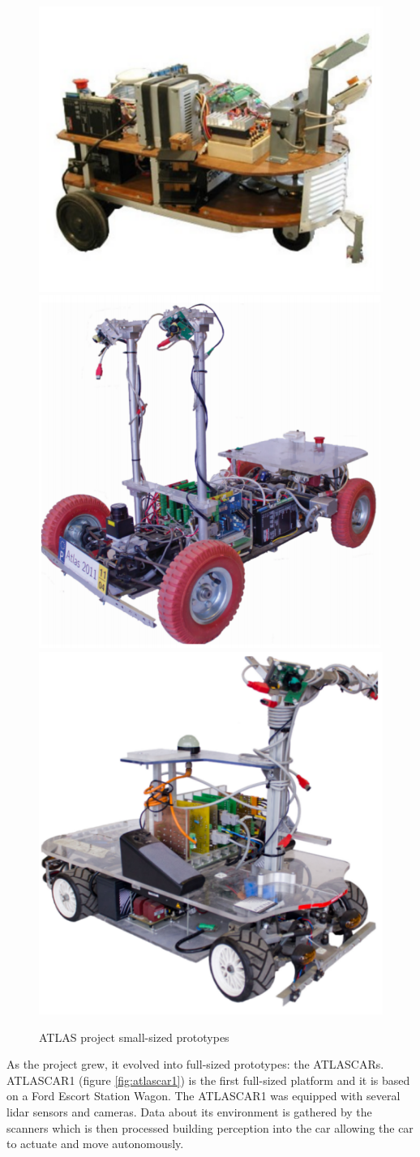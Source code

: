 \begin{figure}[htp]
	
	\centering
	\includegraphics[width=.3\textwidth]{capintro/imgs/atlas1}\hfill
	\includegraphics[width=.3\textwidth]{capintro/imgs/atlas2000}\hfill
	\includegraphics[width=.3\textwidth]{capintro/imgs/atlasmv}
	
	\caption{ATLAS project small-sized prototypes \cite{LARlabs}}
	\label{fig:atlasproto}
	
\end{figure}

As the project grew, it evolved into full-sized prototypes: the ATLASCARs. ATLASCAR1 (figure \ref{fig:atlascar1}) is the first full-sized platform and it is based on a Ford Escort Station Wagon. The ATLASCAR1 was equipped with several \gls{lidar} sensors and cameras. Data about its environment is gathered by the scanners which is then processed building perception into the car allowing the car to actuate and move autonomously. 

